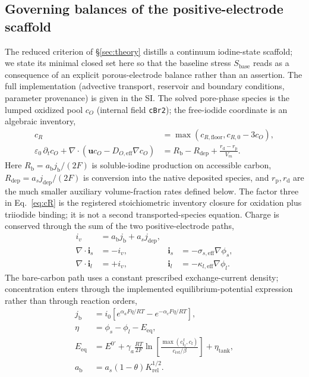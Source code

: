 \documentclass[11pt]{article}
\newcommand{\cf}{c_{\mathrm{I_2}}^{\,\mathrm{f}}}
\begin{document}
\subsection{Governing balances of the positive-electrode scaffold}
\label{sec:backbone}
The reduced criterion of \S\ref{sec:theory} distills a continuum iodine-state scaffold; we state its minimal
closed set here so that the baseline stress $S_{\mathrm{base}}$ reads as a consequence of an explicit
porous-electrode balance rather than an assertion. The full implementation (advective transport, reservoir and
boundary conditions, parameter provenance) is given in the SI. The solved pore-phase species is the lumped
oxidized pool $c_O$ (internal field \texttt{cBr2}); the free-iodide coordinate is an algebraic inventory,
\begin{align}
c_R &= \max\!\left(c_{R,\mathrm{floor}},c_{R,0}-3c_O\right), \label{eq:cR}\\
\varepsilon_0\,\partial_t c_O+\nabla\!\cdot
\left(\mathbf{u}c_O-D_{O,\mathrm{eff}}\nabla c_O\right)
&=R_{\mathrm b}-R_{\mathrm{dep}}+\frac{r_{\mathrm d}-r_{\mathrm p}}{V_m}. \label{eq:cO}
\end{align}
Here $R_{\mathrm b}=a_{\mathrm b}j_{\mathrm b}/(2F)$ is soluble-iodine production on accessible carbon,
$R_{\mathrm{dep}}=a_sj_{\mathrm{dep}}/(2F)$ is conversion into the native deposited species, and
$r_{\mathrm p},r_{\mathrm d}$ are the much smaller auxiliary volume-fraction rates defined below. The factor
three in Eq.~\eqref{eq:cR} is the registered stoichiometric inventory closure for oxidation plus triiodide
binding; it is not a second transported-species equation. Charge is conserved through the sum of the two
positive-electrode paths,
\begin{equation}
\begin{aligned}
i_v&=a_{\mathrm b}j_{\mathrm b}+a_sj_{\mathrm{dep}},\\
\nabla\!\cdot\mathbf{i}_s&=-i_v, & \mathbf{i}_s&=-\sigma_{s,\mathrm{eff}}\nabla\phi_s,\\
\nabla\!\cdot\mathbf{i}_l&=+i_v, & \mathbf{i}_l&=-\kappa_{l,\mathrm{eff}}\nabla\phi_l.
\end{aligned}
\label{eq:charge}
\end{equation}
The bare-carbon path uses a constant prescribed exchange-current density; concentration enters through the
implemented equilibrium-potential expression rather than through reaction orders,
\begin{equation}
\begin{aligned}
j_{\mathrm b} &= i_0\!\left[e^{\alpha_a F\eta/RT}-e^{-\alpha_c F\eta/RT}\right],\\
\eta&=\phi_s-\phi_l-E_{\mathrm{eq}},\\
E_{\mathrm{eq}}&=E^{0\prime}+\gamma_a\frac{RT}{2F}\ln\!\left[
\frac{\max(\cf,c_{\mathrm f})}{c_{\mathrm{ref}}/\beta}\right]+\eta_{\mathrm{tank}},\\
a_{\mathrm b}&=a_s(1-\theta)K_{\mathrm{rel}}^{1/2}.
\end{aligned}
\label{eq:bv}
\end{equation}
\end{document}
